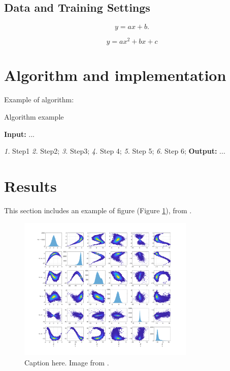 \documentclass[a4paper,fleqn]{cas-sc}
\begin{document}
\subsection{Data and Training Settings}


\begin{equation}
\label{eqn:linear}
    y=ax+b.
\end{equation}


\begin{equation} 
\label{eqn:quadratic}
    y=ax^2+bx+c
\end{equation}

\section{Algorithm and implementation}

Example of algorithm:
\begin{algorithm}
  \caption{Algorithm example }
  
  \begin{algorithmic}
  \label{alg:Alg1}
  \State \textbf{Input:} ...
   \newline

 \Statex \textit{1.} Step1
  \Statex \textit{2.} Step2;
 \State \textit{3.}  Step3;
  \newline
   \State \textit{4.} Step 4;
   \State \textit{5.}  Step 5;
   \State \textit{6.} Step 6;
   \EndFor
  \EndFor 
  \newline
\State  \textbf{Output: } ... 
  \end{algorithmic} 
\end{algorithm} 


\section{Results}


This section includes an example of figure (Figure \ref{fig:Figure1}), from  \cite{de2021direct}.

\begin{figure}
\centering
\includegraphics[width=0.75\textwidth]{figs_rev1/uncond_distribution_reference.png}
\caption{ Caption here. Image from \cite{de2021direct}.}
\label{fig:Figure1}
\end{figure}
\end{document}
